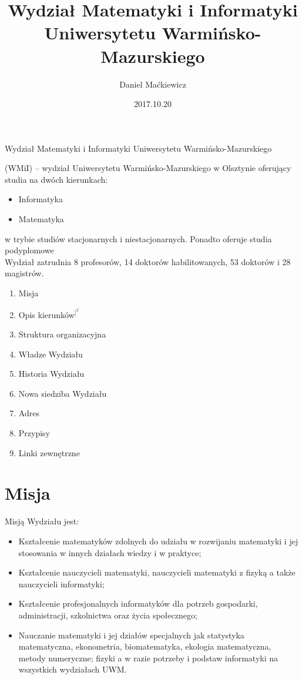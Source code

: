 \documentclass[a4paper,12pt]{article}
\date{2017.10.20}
\title {\bf Wydział Matematyki i Informatyki Uniwersytetu
Warmińsko-Mazurskiego
}
\author{Daniel Maćkiewicz}
\begin{document}
\maketitle


 \begin{bf}  Wydział Matematyki i Informatyki Uniwersytetu Warmińsko-Mazurskiego\end{bf}  (WMiI) – wydział 
Uniwersytetu Warmińsko-Mazurskiego w Olsztynie oferujący studia na dwóch kierunkach: 

\begin{itemize}
 \item Informatyka 
 \item Matematyka 

\end{itemize} 
 w trybie studiów stacjonarnych i niestacjonarnych. Ponadto oferuje studia podyplomowe \vspace{0.2cm}
\\Wydział zatrudnia 8 profesorów, 14 doktorów habilitowanych, 53 doktorów i 28 magistrów.

\begin{enumerate}
 \item Misja 
 \item Opis kierunków$^[^1^]$
 \item Struktura organizacyjna
 \item Władze Wydziału
 \item Historia Wydziału
 \item Nowa siedziba Wydziału
 \item Adres
 \item Przypisy
\item Linki zewnętrzne
\end{enumerate}

\section*{Misja}
Misją Wydziału jest:

\begin{itemize}
\item  Kształcenie matematyków zdolnych do udziału w rozwijaniu matematyki i jej stosowania w innych działach wiedzy i w praktyce;
\item Kształcenie nauczycieli matematyki, nauczycieli matematyki z fizyką a także nauczycieli informatyki;
\item Kształcenie profesjonalnych informatyków dla potrzeb gospodarki, administracji, szkolnictwa oraz życia
społecznego;
\item Nauczanie matematyki i jej działów specjalnych jak statystyka matematyczna, ekonometria,
biomatematyka, ekologia matematyczna, metody numeryczne; fizyki a w razie potrzeby i podstaw
informatyki na wszystkich wydziałach UWM.
\end{itemize}
\end{document}
